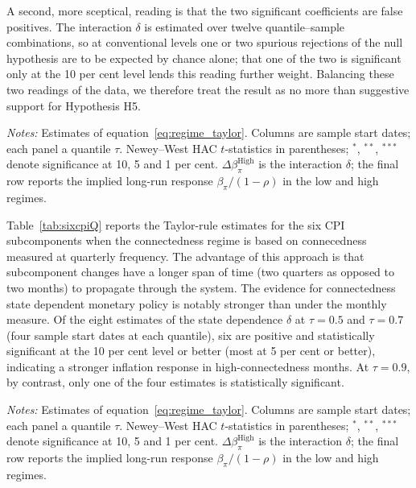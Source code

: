 \documentclass{article}
\begin{document}
A second, more sceptical, reading is that the two significant coefficients
are false positives. The interaction $\delta$ is estimated over twelve quantile--sample
combinations, so at conventional levels one or two spurious rejections of the null hypothesis are to be expected
by chance alone; that one of the two is significant only at the 10 per cent level lends
this reading further weight. Balancing these two readings of the data, we therefore treat the result as no more than suggestive support for Hypothesis H5.

\begin{table}[!htbp]
\centering
\caption{Subcomponent connectedness }
\label{tab:sixconn}


\begin{tablenotes}\footnotesize
\item \textit{Notes:} Estimates of equation~\eqref{eq:regime_taylor}. Columns are sample
start dates; each panel a quantile $\tau$. Newey--West HAC $t$-statistics in parentheses;
$^{*}$, $^{**}$, $^{***}$ denote significance at 10, 5 and 1 per cent. $\Delta\beta_\pi^{
\text{High}}$ is the interaction $\delta$; the final row reports the implied long-run
response $\beta_\pi/(1-\rho)$ in the low and high regimes.
\end{tablenotes}
\end{table}

Table~\ref{tab:sixcpiQ} reports the Taylor-rule estimates for the six CPI subcomponents when
the connectedness regime is based on connecedness measured at quarterly frequency. The advantage of this approach is that subcomponent changes have a longer span of time (two quarters as opposed to two months) to propagate through the system. The evidence for connectedness state dependent monetary policy is notably stronger than under the monthly measure. Of the eight estimates of the state dependence $\delta$ at
$\tau=0.5$ and $\tau=0.7$ (four sample start dates at each quantile), six are positive and
statistically significant at the 10 per cent level or better (most at 5 per cent or better),
indicating a stronger inflation response in high-connectedness months. At $\tau=0.9$, by
contrast, only one of the four estimates is statistically significant.   

\begin{table}[!htbp]
\centering
\caption{Subcomponent connectedness: Quarterly }
\label{tab:sixcpiQ}

 
 


\begin{tablenotes}\footnotesize
\item \textit{Notes:} Estimates of equation~\eqref{eq:regime_taylor}. Columns are sample
start dates; each panel a quantile $\tau$. Newey--West HAC $t$-statistics in parentheses;
$^{*}$, $^{**}$, $^{***}$ denote significance at 10, 5 and 1 per cent. $\Delta\beta_\pi^{
\text{High}}$ is the interaction $\delta$; the final row reports the implied long-run
response $\beta_\pi/(1-\rho)$ in the low and high regimes.
\end{tablenotes}
\end{table}
\end{document}
